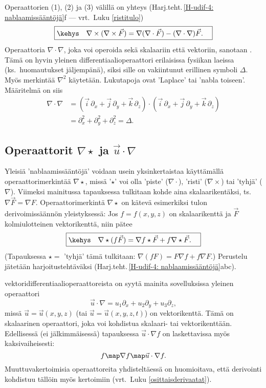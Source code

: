 Operaattorien (1), (2) ja (3) välillä on yhteys
(Harj.teht.\,\ref{H-udif-4: nablaamissääntöjä}f --- vrt.\ Luku \ref{ristitulo})
\[
\boxed{\kehys\quad \nabla\times(\nabla\times\vec F)=\nabla(\nabla\cdot\vec F)
                                                   -(\nabla\cdot\nabla)\vec F. \quad}
\]
Operaattoria $\nabla\cdot\nabla$, joka voi operoida sekä skalaariin että vektoriin, sanotaan 
. Tämä on hyvin yleinen differentiaalioperaattori erilaisissa 
fysiikan laeissa (ks.\ huomautukset jäljempänä), siksi sille on vakiintunut erillinen symboli 
$\Delta$. Myös merkintää $\nabla^2$ käytetään. Lukutapoja ovat 'Laplace' tai 'nabla toiseen'. 
Määritelmä on siis
\begin{align*}
\nabla\cdot\nabla &= (\vec i \, \partial_x+\vec j \, \partial_y +\vec k \, \partial_z)\cdot
                     (\vec i \, \partial_x+\vec j \, \partial_y +\vec k \, \partial_z) \\
                  &=\partial_x^2+\partial_y^2+\partial_z^2=\Delta.
\end{align*}

\subsection*{Operaattorit $\nabla\star$ ja $\vec u\cdot\nabla$}

Yleisiä 'nablaamissääntöjä' voidaan usein yksinkertaistaa käyttämällä operaattorimerkintää
$\nabla\star$, missä '$\star$' voi olla 'piste' ($\nabla\cdot$), 'risti' ($\nabla\times$) tai
'tyhjä' ($\nabla$). Viimeksi mainitussa tapauksessa tulkitaan kohde aina skalaarikentäksi,
ts.\ $\nabla\vec F=\nabla F$. Operaattorimerkintä $\nabla\star$ on kätevä esimerkiksi tulon
derivoimissäännön yleistyksessä: Jos $f=f(x,y,z)$ on skalaarikenttä ja $\vec F$
kolmiulotteinen vektorikenttä, niin pätee
\[
\boxed{\kehys\quad \nabla\star(f\vec F)=\nabla f\star\vec F + f\nabla\star\vec F. \quad}
\] 
(Tapauksessa $\star=$ 'tyhjä' tämä tulkitaan: $\nabla(fF)=F\nabla f+f\nabla F$.)
Perustelu jätetään harjoitustehtäväksi (Harj.teht.\,\ref{H-udif-4: nablaamissääntöjä}abc). 

%
 vektoridifferentiaalioperaattoreista on syytä mainita
sovelluksissa yleinen operaattori
\[
\vec u\cdot\nabla  = u_1\partial_x + u_2\partial_y + u_3\partial_z,
\]
missä $\vec u=\vec u(x,y,z)$ (tai $\vec u=\vec u(x,y,z,t)$) on vektorikenttä. Tämä on
skalaarinen operaattori, joka voi kohdistua skalaari- tai vektorikenttään. Edellisessä
(ei jälkimmäisessä) tapauksessa $\vec u\cdot\nabla f$ on laskettavissa myös kaksivaiheisesti:
\[
f \map \nabla f \map \vec u\cdot\nabla f.
\]
Muuttuvakertoimisia operaattoreita yhdisteltäessä on huomioitava, että derivointi kohdistuu 
tällöin myös kertoimiin (vrt.\ Luku \ref{osittaisderivaatat}).

